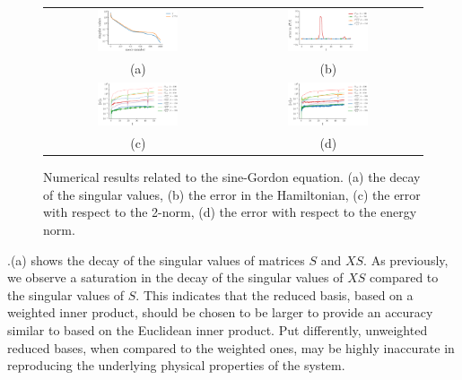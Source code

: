 \begin{figure} 
\begin{tabular}{cc}
\includegraphics[width=0.45\textwidth]{./images/paper2/sine/singulars} & \includegraphics[width=0.45\textwidth]{./images/paper2/sine/energy} \\
(a) & (b) \\
\includegraphics[width=0.45\textwidth]{./images/paper2/sine/l2} & \includegraphics[width=0.45\textwidth]{./images/paper2/sine/energy_norm} \\
(c) & (d) \\
\end{tabular}
\caption{Numerical results related to the sine-Gordon equation. (a) the decay of the singular values, (b) the error in the Hamiltonian, (c) the error with respect to the 2-norm, (d) the error with respect to the energy norm.} \label{fig:2}
\end{figure}

.(a) shows the decay of the singular values of matrices $S$ and $XS$. As previously, we observe a saturation in the decay of the singular values of $XS$ compared to the singular values of $S$. This indicates that the reduced basis, based on a weighted inner product, should be chosen to be larger to provide an accuracy similar to based on the Euclidean inner product. Put differently, unweighted reduced bases, when compared to the weighted ones, may be highly inaccurate in reproducing the underlying physical properties of the system.

